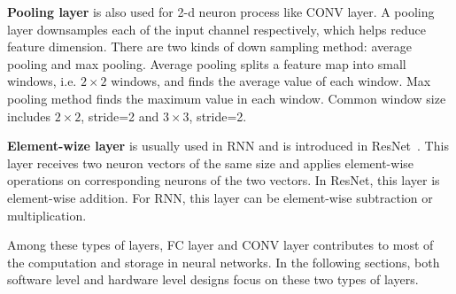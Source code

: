 {\bf{Pooling layer}} is also used for 2-d neuron process like CONV layer. A pooling layer downsamples each of the input channel respectively, which helps reduce feature dimension. There are two kinds of down sampling method: average pooling and max pooling. Average pooling splits a feature map into small windows, i.e. $2\times2$ windows, and finds the average value of each window. Max pooling method finds the maximum value in each window. Common window size includes $2\times2$, stride=2 and $3\times3$, stride=2.

{\bf{Element-wize layer}} is usually used in RNN and is introduced in ResNet~\cite{he2016deep}. This layer receives two neuron vectors of the same size and applies element-wise operations on corresponding neurons of the two vectors. In ResNet, this layer is element-wise addition. For RNN, this layer can be element-wise subtraction or multiplication.

Among these types of layers, FC layer and CONV layer contributes to most of the computation and storage in neural networks. In the following sections, both software level and hardware level designs focus on these two types of layers.

